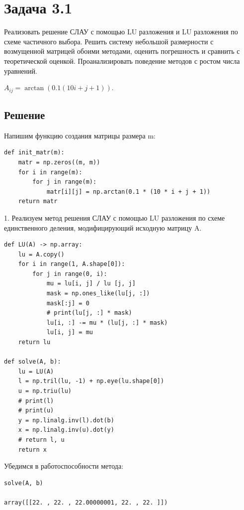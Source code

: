 \section*{Задача 3.1}
Реализовать решение СЛАУ с помощью LU разложения и LU разложения по схеме частичного выбора. Решить систему небольшой размерности с возмущенной матрицей обоими методами, оценить погрешность и сравнить с теоретической оценкой. Проанализировать поведение  методов с ростом числа уравнений.

$A_{ij} = \arctan(0.1 (10i + j + 1)).$

\subsection*{Решение}
Напишим функцию создания матрицы размера m:
\begin{verbatim}
def init_matr(m):
    matr = np.zeros((m, m))
    for i in range(m):
        for j in range(m):
            matr[i][j] = np.arctan(0.1 * (10 * i + j + 1))
    return matr
\end{verbatim}

1. Реализуем метод решения СЛАУ с помощью LU разложения по схеме единственного деления, модифицирующий исходную матрицу A.
\begin{verbatim}
def LU(A) -> np.array:
    lu = A.copy()
    for i in range(1, A.shape[0]):
        for j in range(0, i):
            mu = lu[i, j] / lu [j, j]
            mask = np.ones_like(lu[j, :])
            mask[:j] = 0
            # print(lu[j, :] * mask)
            lu[i, :] -= mu * (lu[j, :] * mask)
            lu[i, j] = mu
    return lu

def solve(A, b):
    lu = LU(A)
    l = np.tril(lu, -1) + np.eye(lu.shape[0])
    u = np.triu(lu)
    # print(l)
    # print(u)
    y = np.linalg.inv(l).dot(b)
    x = np.linalg.inv(u).dot(y)
    # return l, u
    return x
\end{verbatim}

Убедимся в работоспособности метода:
\begin{verbatim}
solve(A, b)

array([[22. , 22. , 22.00000001, 22. , 22. ]])
\end{verbatim}

